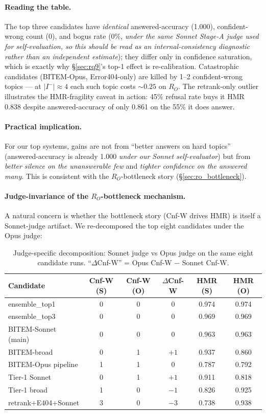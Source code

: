 \documentclass[11pt,a4paper]{article}
\newcommand{\HMR}{\textsc{HMR}}
\begin{document}
\paragraph{Reading the table.} The top three candidates have
\emph{identical} answered-accuracy (1.000), confident-wrong count
(0), and bogus rate (0\%, \emph{under the same Sonnet Stage-A judge
used for self-evaluation, so this should be read as an
internal-consistency diagnostic rather than an independent estimate});
they differ only in confidence
saturation, which is exactly why \S\ref{sec:rq9}'s top-1 effect is
re-calibration. Catastrophic candidates (BITEM-Opus, Error404-only)
are killed by 1–2 confident-wrong topics — at $|I^-| \approx 4$ each
such topic costs $\sim 0.25$ on $R_O$. The retrank-only outlier
illustrates the HMR-fragility caveat in action: 45\% refusal rate
buys it \HMR{} 0.838 despite answered-accuracy of only 0.861 on the
55\% it does answer.

\paragraph{Practical implication.} For our top systems, gains are not
from ``better answers on hard topics'' (answered-accuracy is already
1.000 \emph{under our Sonnet self-evaluator}) but from \emph{better
silence on the unanswerable few} and \emph{tighter confidence on the
answered many}. This is consistent with the $R_O$-bottleneck story
(\S\ref{sec:ro_bottleneck}).

\paragraph{Judge-invariance of the $R_O$-bottleneck mechanism.}
A natural concern is whether the bottleneck story (Cnf-W drives HMR)
is itself a Sonnet-judge artifact. We re-decomposed the top eight
candidates under the Opus judge:

\begin{table}[h]
\centering
\caption{Judge-specific decomposition: Sonnet judge vs Opus judge on
the same eight candidate runs. ``$\Delta$Cnf-W'' = Opus Cnf-W $-$
Sonnet Cnf-W.}
\label{tab:judge_specific_decomp}
\small
\begin{tabular}{lccccc}
\toprule
Candidate & Cnf-W (S) & Cnf-W (O) & $\Delta$Cnf-W & HMR (S) & HMR (O) \\
\midrule
ensemble\_top1            & 0 & 0 & $0$  & 0.974 & 0.974 \\
ensemble\_top3            & 0 & 0 & $0$  & 0.969 & 0.969 \\
BITEM-Sonnet (main)       & 0 & 0 & $0$  & 0.963 & 0.963 \\
BITEM-broad               & 0 & 1 & $+1$ & 0.937 & 0.860 \\
BITEM-Opus pipeline       & 1 & 1 & $0$  & 0.787 & 0.792 \\
Tier-1 Sonnet             & 0 & 1 & $+1$ & 0.911 & 0.818 \\
Tier-1 broad              & 1 & 0 & $-1$ & 0.826 & 0.925 \\
retrank+E404+Sonnet       & 3 & 0 & $-3$ & 0.738 & 0.938 \\
\bottomrule
\end{tabular}
\end{table}
\end{document}
